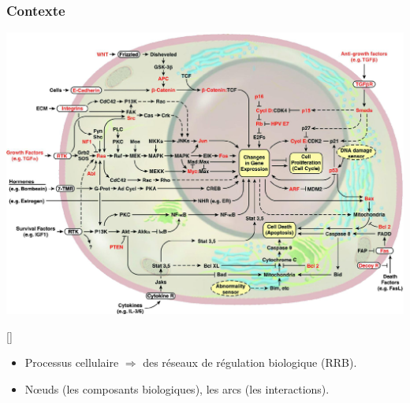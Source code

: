 \begin{frame}[c]
  \frametitle{Contexte}
\begin{center}
  \includegraphics[scale=0.12]{images/cellule-description.jpeg}
\end{center}
\begin{center}
{\tiny \color{darkgreen}[\citelui]}
\end{center}


\begin{itemize}
\item Processus cellulaire $\Longrightarrow$ des réseaux de régulation biologique (RRB).
\item N{\oe}uds (les composants biologiques), les arcs (les interactions).
\end{itemize}



\end{frame}
